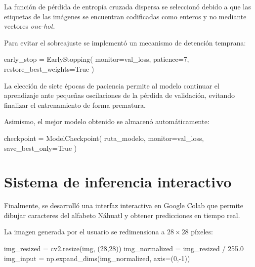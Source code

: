 \documentclass[
  spanish,
  us-letterpaper,
  DIV=11,
  numbers=noendperiod]{scrreprt}
\newenvironment{Shaded}{\begin{snugshade}}{\end{snugshade}}
\newcommand{\DecValTok}[1]{\textcolor[rgb]{0.68,0.00,0.00}{#1}}
\newcommand{\FloatTok}[1]{\textcolor[rgb]{0.68,0.00,0.00}{#1}}
\newcommand{\NormalTok}[1]{\textcolor[rgb]{0.00,0.23,0.31}{#1}}
\newcommand{\OperatorTok}[1]{\textcolor[rgb]{0.37,0.37,0.37}{#1}}
\newcommand{\StringTok}[1]{\textcolor[rgb]{0.13,0.47,0.30}{#1}}
\newcommand{\VariableTok}[1]{\textcolor[rgb]{0.07,0.07,0.07}{#1}}
\begin{document}
La función de pérdida de entropía cruzada dispersa se seleccionó debido
a que las etiquetas de las imágenes se encuentran codificadas como
enteros y no mediante vectores \emph{one-hot}.

Para evitar el sobreajuste se implementó un mecanismo de detención
temprana:

\begin{Shaded}
\begin{Highlighting}[]
\NormalTok{early\_stop }\OperatorTok{=}\NormalTok{ EarlyStopping(}
\NormalTok{    monitor}\OperatorTok{=}\StringTok{\textquotesingle{}val\_loss\textquotesingle{}}\NormalTok{,}
\NormalTok{    patience}\OperatorTok{=}\DecValTok{7}\NormalTok{,}
\NormalTok{    restore\_best\_weights}\OperatorTok{=}\VariableTok{True}
\NormalTok{)}
\end{Highlighting}
\end{Shaded}

La elección de siete épocas de paciencia permite al modelo continuar el
aprendizaje ante pequeñas oscilaciones de la pérdida de validación,
evitando finalizar el entrenamiento de forma prematura.

Asimismo, el mejor modelo obtenido se almacenó automáticamente:

\begin{Shaded}
\begin{Highlighting}[]
\NormalTok{checkpoint }\OperatorTok{=}\NormalTok{ ModelCheckpoint(}
\NormalTok{    ruta\_modelo,}
\NormalTok{    monitor}\OperatorTok{=}\StringTok{\textquotesingle{}val\_loss\textquotesingle{}}\NormalTok{,}
\NormalTok{    save\_best\_only}\OperatorTok{=}\VariableTok{True}
\NormalTok{)}
\end{Highlighting}
\end{Shaded}

\section{Sistema de inferencia
interactivo}\label{sistema-de-inferencia-interactivo}

Finalmente, se desarrolló una interfaz interactiva en Google Colab que
permite dibujar caracteres del alfabeto Náhuatl y obtener predicciones
en tiempo real.

La imagen generada por el usuario se redimensiona a \(28\times28\)
píxeles:

\begin{Shaded}
\begin{Highlighting}[]
\NormalTok{img\_resized }\OperatorTok{=}\NormalTok{ cv2.resize(img, (}\DecValTok{28}\NormalTok{,}\DecValTok{28}\NormalTok{))}
\NormalTok{img\_normalized }\OperatorTok{=}\NormalTok{ img\_resized }\OperatorTok{/} \FloatTok{255.0}
\NormalTok{img\_input }\OperatorTok{=}\NormalTok{ np.expand\_dims(img\_normalized, axis}\OperatorTok{=}\NormalTok{(}\DecValTok{0}\NormalTok{,}\OperatorTok{{-}}\DecValTok{1}\NormalTok{))}
\end{Highlighting}
\end{Shaded}
\end{document}
